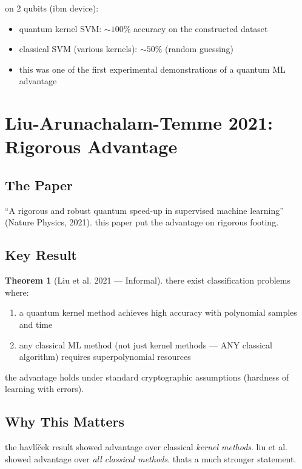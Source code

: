 \documentclass[11pt,a4paper]{article}
\theoremstyle{definition}
\newtheorem{theorem}{Theorem}[section]
\theoremstyle{remark}
\begin{document}
on 2 qubits (ibm device):
\begin{itemize}
    \item quantum kernel SVM: $\sim 100\%$ accuracy on the constructed dataset
    \item classical SVM (various kernels): $\sim 50\%$ (random guessing)
    \item this was one of the first experimental demonstrations of a quantum ML advantage
\end{itemize}

\section{Liu-Arunachalam-Temme 2021: Rigorous Advantage}

\subsection{The Paper}

``A rigorous and robust quantum speed-up in supervised machine learning'' (Nature Physics, 2021). this paper put the advantage on rigorous footing.

\subsection{Key Result}

\begin{theorem}[Liu et al. 2021 --- Informal]
there exist classification problems where:
\begin{enumerate}
    \item a quantum kernel method achieves high accuracy with polynomial samples and time
    \item any classical ML method (not just kernel methods --- ANY classical algorithm) requires superpolynomial resources
\end{enumerate}
the advantage holds under standard cryptographic assumptions (hardness of learning with errors).
\end{theorem}

\subsection{Why This Matters}

the havl\'i\v{c}ek result showed advantage over classical \textit{kernel methods}. liu et al. showed advantage over \textit{all classical methods}. thats a much stronger statement.
\end{document}

